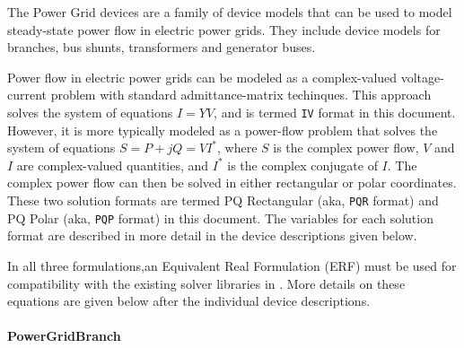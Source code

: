 

 
The Power Grid devices are a family of device models that can be used to model  
steady-state power flow in electric power grids.  They include device models for 
branches, bus shunts, transformers and generator buses.  

Power flow in electric power grids can be modeled as a complex-valued voltage-current
problem with standard admittance-matrix techinques. This approach solves the system of
equations $I=YV$, and is termed \texttt{IV} format in this document.  However, it is 
more typically modeled as a power-flow problem that solves the system of equations 
$S = P + jQ = VI^{*}$, where $S$ is the complex power flow, $V$ and $I$ are complex-valued 
quantities, and $I^{*}$ is the complex conjugate of $I$.  The complex power flow can
then be solved in either rectangular or polar coordinates.  These two solution formats are
termed PQ Rectangular (aka, \texttt{PQR} format) and PQ Polar (aka, \texttt{PQP} format) in 
this document.  The variables for each solution format are described in more detail in the
device descriptions given below. 

In all three formulations,an Equivalent Real Formulation (ERF) \cite{Munankarmy} must be used
for compatibility with the existing solver libraries in \Xyce{}.  More details on these 
equations are given below after the individual device descriptions.
 
\paragraph{PowerGridBranch}

